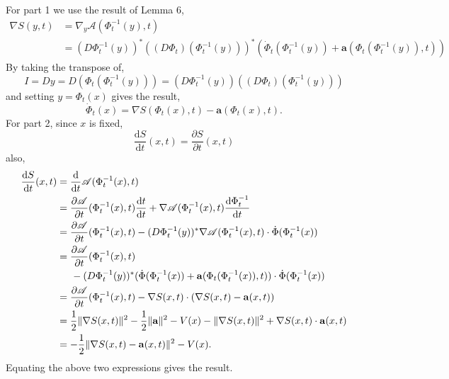 \documentclass[a4paper,12pt,draft]{report}
\begin{document}
{
For part 1 we use the result of Lemma 6,
\begin{align}
\nabla S(y, t) & = \nabla_y\mathscr{A}(\Phi_t^{-1}(y), t)\nonumber\\
& = (D\Phi_t^{-1}(y))^*((D\Phi_t)(\Phi_t^{-1}(y)))^*(\dot{\Phi}_t(\Phi_t^{-1}(y)) + \mathbf{a}(\Phi_t(\Phi_t^{-1}(y)), t))\nonumber
\end{align}
By taking the transpose of,
$$
I = Dy = D(\Phi_t(\Phi_t^{-1}(y))) = (D\Phi_t^{-1}(y))((D\Phi_t)(\Phi_t^{-1}(y)))
$$
and setting $y = \Phi_t(x)$ gives the result,
$$
\dot{\Phi}_t(x) = \nabla S(\Phi_t(x), t) - \mathbf{a}(\Phi_t(x), t).
$$
For part 2, since $x$ is fixed,
$$
\frac{\mathrm{d}S}{\mathrm{d}t}(x, t) = \frac{\partial S}{\partial t}(x, t)
$$
also,
\begin{align}
\frac{\mathrm{d}S}{\mathrm{d}t}(x, t) & = \frac{\mathrm{d}}{\mathrm{d}t}\mathscr{A}(\Phi_t^{-1}(x), t)\nonumber\\
& = \frac{\partial\mathscr{A}}{\partial t}(\Phi_t^{-1}(x), t)\frac{\mathrm{d}t}{\mathrm{d}t} + \nabla\mathscr{A}(\Phi_t^{-1}(x), t)\frac{\mathrm{d}\Phi_t^{-1}}{\mathrm{d}t}\nonumber\\
& = \frac{\partial\mathscr{A}}{\partial t}(\Phi_t^{-1}(x), t) - (D\Phi_t^{-1}(y))^*\nabla\mathscr{A}(\Phi_t^{-1}(x), t)\cdot\dot{\Phi}(\Phi_t^{-1}(x))\nonumber\\
& = \frac{\partial\mathscr{A}}{\partial t}(\Phi_t^{-1}(x), t)\nonumber\\
& \hspace{0.5cm} - (D\Phi_t^{-1}(y))^*(\dot{\Phi}(\Phi_t^{-1}(x)) + \mathbf{a}(\Phi_t(\Phi_t^{-1}(x)), t))\cdot\dot{\Phi}(\Phi_t^{-1}(x))\nonumber\\
& = \frac{\partial\mathscr{A}}{\partial t}(\Phi_t^{-1}(x), t) - \nabla S(x, t)\cdot(\nabla S(x, t) - \mathbf{a}(x, t))\nonumber\\
& = \frac{1}{2}\|\nabla S(x, t)\|^2 - \frac{1}{2}\|\mathbf{a}\|^2 - V(x) - \|\nabla S(x, t)\|^2 + \nabla S(x, t)\cdot\mathbf{a}(x, t)\nonumber\\
& = -\frac{1}{2}\|\nabla S(x, t) - \mathbf{a}(x, t)\|^2 - V(x).\nonumber
\end{align}
Equating the above two expressions gives the result.

}
\end{document}
